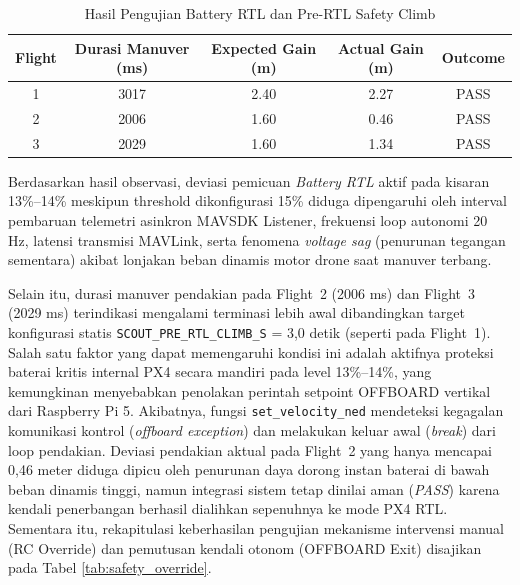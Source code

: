 \begin{table}[H]
	\centering
	\caption{Hasil Pengujian Battery RTL dan Pre-RTL Safety Climb}
	\label{tab:safety_pre_rtl}
	\renewcommand{\arraystretch}{1.2}
	\small
	\begin{tabular}{|c|c|c|c|c|}
		\hline
		\textbf{Flight} &
		\textbf{Durasi Manuver (ms)} &
		\textbf{Expected Gain (m)} &
		\textbf{Actual Gain (m)} &
		\textbf{Outcome}
		\\ \hline
		
		1 & 3017 & 2.40 & 2.27 & PASS \\ \hline
		2 & 2006 & 1.60 & 0.46 & PASS \\ \hline
		3 & 2029 & 1.60 & 1.34 & PASS \\ \hline
		
	\end{tabular}
\end{table}

Berdasarkan hasil observasi, deviasi pemicuan \textit{Battery RTL} aktif pada kisaran 13\%--14\% meskipun threshold dikonfigurasi 15\% diduga dipengaruhi oleh interval pembaruan telemetri asinkron MAVSDK Listener, frekuensi loop autonomi 20 Hz, latensi transmisi MAVLink, serta fenomena \textit{voltage sag} (penurunan tegangan sementara) akibat lonjakan beban dinamis motor drone saat manuver terbang. 

Selain itu, durasi manuver pendakian pada Flight~2 (2006 ms) dan Flight~3 (2029 ms) terindikasi mengalami terminasi lebih awal dibandingkan target konfigurasi statis \texttt{SCOUT\_PRE\_RTL\_CLIMB\_S} = 3,0 detik (seperti pada Flight~1). Salah satu faktor yang dapat memengaruhi kondisi ini adalah aktifnya proteksi baterai kritis internal PX4 secara mandiri pada level 13\%--14\%, yang kemungkinan menyebabkan penolakan perintah setpoint OFFBOARD vertikal dari Raspberry Pi 5. Akibatnya, fungsi \texttt{set\_velocity\_ned} mendeteksi kegagalan komunikasi kontrol (\textit{offboard exception}) dan melakukan keluar awal (\textit{break}) dari loop pendakian. Deviasi pendakian aktual pada Flight~2 yang hanya mencapai 0,46 meter diduga dipicu oleh penurunan daya dorong instan baterai di bawah beban dinamis tinggi, namun integrasi sistem tetap dinilai aman (\textit{PASS}) karena kendali penerbangan berhasil dialihkan sepenuhnya ke mode PX4 RTL. Sementara itu, rekapitulasi keberhasilan pengujian mekanisme intervensi manual (RC Override) dan pemutusan kendali otonom (OFFBOARD Exit) disajikan pada Tabel \ref{tab:safety_override}.

